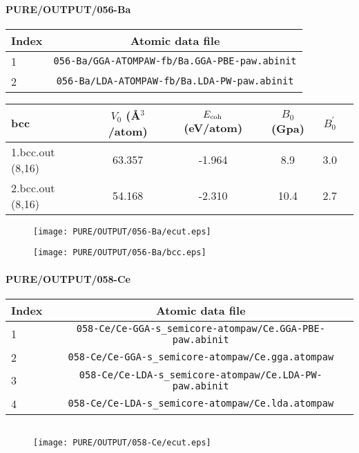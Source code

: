\documentclass[onecolumn]{revtex4}
\begin{document}
\paragraph*{\bf{PURE/OUTPUT/056-Ba}}
\begin{center}
\begin{tabular}{lc}
\hline
Index & Atomic data file \\
\hline
1 & \verb?056-Ba/GGA-ATOMPAW-fb/Ba.GGA-PBE-paw.abinit?\\
2 & \verb?056-Ba/LDA-ATOMPAW-fb/Ba.LDA-PW-paw.abinit?\\
\hline
\end{tabular}
\end{center}
\begin{center}
\begin{tabular}{lccccc}
\hline
\hline
\bf{bcc}&$V_0$ (\AA$^3$/atom)&$E_{\rm coh}$ (eV/atom)&$B_0$ (Gpa)&$B_0^{'}$& \\
\hline
1.bcc.out (8,16)& 63.357 &-1.964 & 8.9 & 3.0 & \\ 
2.bcc.out (8,16)& 54.168 &-2.310 & 10.4 & 2.7 & \\ 
\hline
\hline
\end{tabular}
\end{center}
\begin{figure}[h] 
\centering 
\texttt{[image: PURE/OUTPUT/056-Ba/ecut.eps]}
\end{figure}
\begin{figure}[h] 
\centering 
\texttt{[image: PURE/OUTPUT/056-Ba/bcc.eps]}
\end{figure}
\newpage
\paragraph*{\bf{PURE/OUTPUT/058-Ce}}
\begin{center}
\begin{tabular}{lc}
\hline
Index & Atomic data file \\
\hline
1 & \verb?058-Ce/Ce-GGA-s_semicore-atompaw/Ce.GGA-PBE-paw.abinit?\\
2 & \verb?058-Ce/Ce-GGA-s_semicore-atompaw/Ce.gga.atompaw?\\
3 & \verb?058-Ce/Ce-LDA-s_semicore-atompaw/Ce.LDA-PW-paw.abinit?\\
4 & \verb?058-Ce/Ce-LDA-s_semicore-atompaw/Ce.lda.atompaw?\\
\hline
\end{tabular}
\end{center}
\begin{center}
\begin{tabular}{lccccc}
\hline
\hline
\end{tabular}
\end{center}
\begin{figure}[h] 
\centering 
\texttt{[image: PURE/OUTPUT/058-Ce/ecut.eps]}
\end{figure}
\newpage
\end{document}
